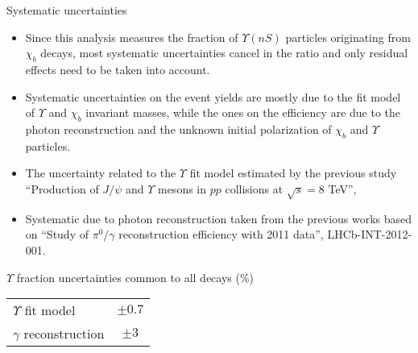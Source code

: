 \begin{frame}{Systematic uncertainties}
\scriptsize
\begin{itemize}
\item Since this analysis measures the fraction of $\Upsilon(nS)$ particles
originating from $\chi_b$ decays, most systematic uncertainties cancel in the
ratio and only residual effects need to be taken into account.
\item Systematic uncertainties on the event yields are mostly
due to the fit model of $\Upsilon$ and $\chi_b$ invariant masses, while the
ones on the efficiency are due to the photon reconstruction and the unknown
initial polarization of $\chi_b$ and $\Upsilon$ particles.
\end{itemize}

\bigskip

\begin{itemize}
\item The uncertainty related to the  $\Upsilon$ fit model estimated by the previous study ``Production of $J/\psi$ and $\Upsilon$ mesons in $pp$ collisions at $\sqrt{s} = 8$ TeV'', 
\item Systematic due to photon reconstruction taken from the previous works based on
``Study of $\pi^0/\gamma$ reconstruction efficiency with 2011 data'', LHCb-INT-2012-001.
\end{itemize}

\bigskip

\begin{center}

$\Upsilon$ fraction uncertainties common to all \chib decays (\%)

\begin{tabular}{lc}
\toprule
$\Upsilon$ fit model & $\pm 0.7$ \\
$\gamma$ reconstruction & $\pm 3$ \\
\bottomrule
\end{tabular}
\end{center}

\end{frame}
